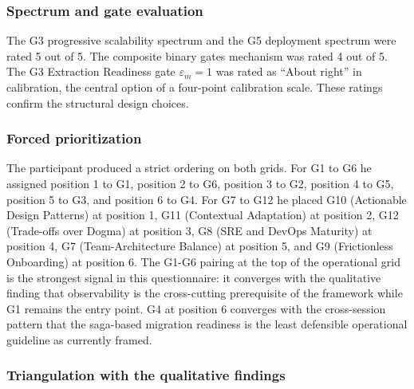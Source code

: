 \subsubsection*{Spectrum and gate evaluation}

The G3 progressive scalability spectrum and the G5 deployment spectrum were rated 5 out of 5. The composite binary gates mechanism was rated 4 out of 5. The G3 Extraction Readiness gate $\varepsilon_m = 1$ was rated as ``About right'' in calibration, the central option of a four-point calibration scale. These ratings confirm the structural design choices.

\subsubsection*{Forced prioritization}

The participant produced a strict ordering on both grids. For G1 to G6 he assigned position 1 to G1, position 2 to G6, position 3 to G2, position 4 to G5, position 5 to G3, and position 6 to G4. For G7 to G12 he placed G10 (Actionable Design Patterns) at position 1, G11 (Contextual Adaptation) at position 2, G12 (Trade-offs over Dogma) at position 3, G8 (SRE and DevOps Maturity) at position 4, G7 (Team-Architecture Balance) at position 5, and G9 (Frictionless Onboarding) at position 6. The G1-G6 pairing at the top of the operational grid is the strongest signal in this questionnaire: it converges with the qualitative finding that observability is the cross-cutting prerequisite of the framework while G1 remains the entry point. G4 at position 6 converges with the cross-session pattern that the saga-based migration readiness is the least defensible operational guideline as currently framed.

\subsubsection*{Triangulation with the qualitative findings}

